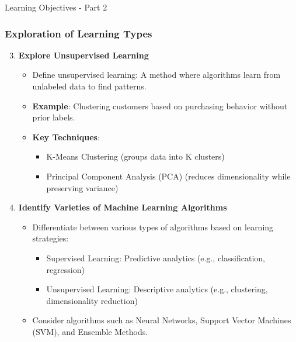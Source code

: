 \documentclass[aspectratio=169]{beamer}
\begin{document}
\begin{frame}[fragile]{Learning Objectives - Part 2}
    \frametitle{Exploration of Learning Types}
    \begin{enumerate}
        \setcounter{enumi}{2}
        \item \textbf{Explore Unsupervised Learning}
        \begin{itemize}
            \item Define unsupervised learning: A method where algorithms learn from unlabeled data to find patterns.
            \item \textbf{Example}: Clustering customers based on purchasing behavior without prior labels.
            \item \textbf{Key Techniques}:
            \begin{itemize}
                \item K-Means Clustering (groups data into K clusters)
                \item Principal Component Analysis (PCA) (reduces dimensionality while preserving variance)
            \end{itemize}
        \end{itemize}
        
        \item \textbf{Identify Varieties of Machine Learning Algorithms}
        \begin{itemize}
            \item Differentiate between various types of algorithms based on learning strategies:
            \begin{itemize}
                \item Supervised Learning: Predictive analytics (e.g., classification, regression)
                \item Unsupervised Learning: Descriptive analytics (e.g., clustering, dimensionality reduction)
            \end{itemize}
            \item Consider algorithms such as Neural Networks, Support Vector Machines (SVM), and Ensemble Methods.
        \end{itemize}
    \end{enumerate}
\end{frame}
\end{document}
